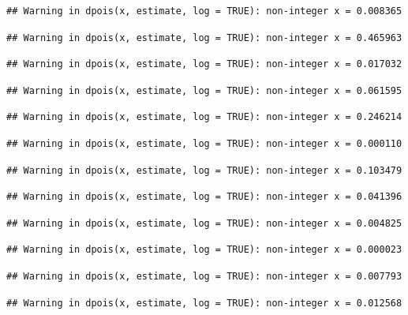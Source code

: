 \documentclass[]{article}
\begin{document}
\begin{verbatim}
## Warning in dpois(x, estimate, log = TRUE): non-integer x = 0.008365
\end{verbatim}

\begin{verbatim}
## Warning in dpois(x, estimate, log = TRUE): non-integer x = 0.465963
\end{verbatim}

\begin{verbatim}
## Warning in dpois(x, estimate, log = TRUE): non-integer x = 0.017032
\end{verbatim}

\begin{verbatim}
## Warning in dpois(x, estimate, log = TRUE): non-integer x = 0.061595
\end{verbatim}

\begin{verbatim}
## Warning in dpois(x, estimate, log = TRUE): non-integer x = 0.246214
\end{verbatim}

\begin{verbatim}
## Warning in dpois(x, estimate, log = TRUE): non-integer x = 0.000110
\end{verbatim}

\begin{verbatim}
## Warning in dpois(x, estimate, log = TRUE): non-integer x = 0.103479
\end{verbatim}

\begin{verbatim}
## Warning in dpois(x, estimate, log = TRUE): non-integer x = 0.041396
\end{verbatim}

\begin{verbatim}
## Warning in dpois(x, estimate, log = TRUE): non-integer x = 0.004825
\end{verbatim}

\begin{verbatim}
## Warning in dpois(x, estimate, log = TRUE): non-integer x = 0.000023
\end{verbatim}

\begin{verbatim}
## Warning in dpois(x, estimate, log = TRUE): non-integer x = 0.007793
\end{verbatim}

\begin{verbatim}
## Warning in dpois(x, estimate, log = TRUE): non-integer x = 0.012568
\end{verbatim}
\end{document}
